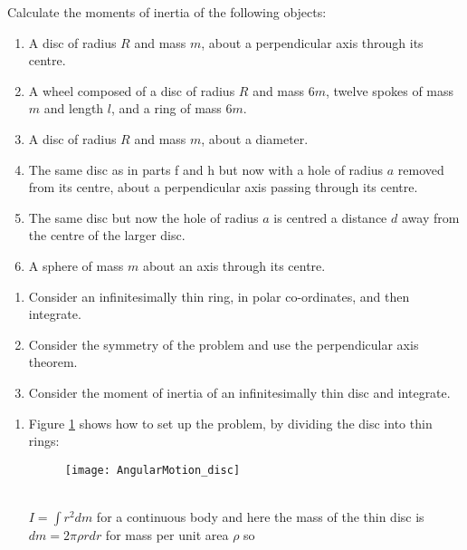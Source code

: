 \begin{hint}
{
Calculate the moments of inertia of the following objects:
\begin{enumerate}
\item A disc of radius $R$ and mass $m$, about a perpendicular axis through its centre. 
\item A wheel composed of a disc of radius $R$ and mass $6m$, twelve spokes of mass $m$ and length $l$, and a ring of mass $6m$. 
\item A disc of radius $R$ and mass $m$, about a diameter.
\item The same disc as in parts f and h but now with a hole of radius $a$ removed from its centre, about a perpendicular axis passing through its centre. 
\item The same disc but now the hole of radius $a$ is centred a distance $d$ away from the centre of the larger disc. 
\item A sphere of mass $m$ about an axis through its centre.
\end{enumerate}
}
{
\begin{enumerate}
\item Consider an infinitesimally thin ring, in polar co-ordinates,  and then integrate. 
\setcounter{enumi}{2} 
\item Consider the symmetry of the problem and use the perpendicular axis theorem.  
\setcounter{enumi}{5}
\item Consider the moment of inertia of an infinitesimally thin disc and integrate. 
\end{enumerate}
}
{%
}
{
\begin{enumerate}
\item Figure \ref{fig:AngularMotion_disc} shows how to set up the problem, by dividing the disc into thin rings:
\begin{figure}[h]
\centering
\texttt{[image: AngularMotion\_disc]}
\caption{}
\label{fig:AngularMotion_disc}
\end{figure}
\\
$I=\int r^2dm$ for a continuous body and here the mass of the thin disc is $dm=2\pi\rho rdr$ for mass per unit area $\rho$ so 

\end{enumerate}}
\end{hint}
